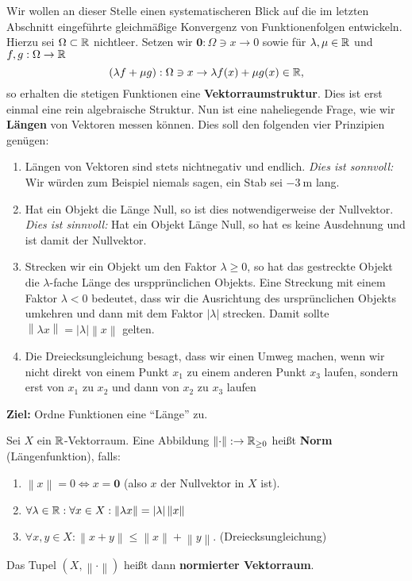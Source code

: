 Wir wollen an dieser Stelle einen systematischeren Blick auf die im letzten Abschnitt eingeführte gleichmäßige Konvergenz von Funktionenfolgen entwickeln. Hierzu sei $ \Omega \subset  \mathbb{R}  $ nichtleer. Setzen wir $ \mathbf{0}: \Omega \ni x \to 0 $ sowie für $ \lambda, \mu \in \mathbb{R}  $ und $ f,g:\Omega \to \mathbb{R}  $ 
\[
	(\lambda f + \mu g): \Omega \ni x \to \lambda f(x) + \mu g(x) \in \mathbb{R} ,
\]
so erhalten die stetigen Funktionen eine \textbf{Vektorraumstruktur}. Dies ist erst einmal eine rein algebraische Struktur. Nun ist eine naheliegende Frage, wie wir \textbf{Längen} von Vektoren messen können. Dies soll den folgenden vier Prinzipien genügen:
\begin{enumerate}[label=(P\arabic*)]
	\item Längen von Vektoren sind stets nichtnegativ und endlich. \textit{Dies ist sonnvoll:} Wir würden zum Beispiel niemals sagen, ein Stab sei $ \qty{ -3 }{ \metre }  $ lang.
	\item Hat ein Objekt die Länge Null, so ist dies notwendigerweise der Nullvektor. \textit{Dies ist sinnvoll:} Hat ein Objekt Länge Null, so hat es keine Ausdehnung und ist damit der Nullvektor.
	\item Strecken wir ein Objekt um den Faktor $ \lambda \geq 0 $, so hat das gestreckte Objekt die $ \lambda $-fache Länge des urspprünclichen Objekts. Eine Streckung mit einem Faktor $ \lambda < 0 $ bedeutet, dass wir die Ausrichtung des ursprünclichen Objekts umkehren und dann mit dem Faktor $ \left| \lambda \right| $ strecken. Damit sollte $ \left\| \lambda x \right\| = \left| \lambda \right| \left\| x \right\|  $ gelten.
	\item Die Dreiecksungleichung besagt, dass wir einen Umweg machen, wenn wir nicht direkt von einem Punkt $ x_1 $ zu einem anderen Punkt $ x_3 $ laufen, sondern erst von $ x_1 $ zu $ x_2 $ und dann von $ x_2 $ zu $ x_3 $ laufen
\end{enumerate}

\textbf{Ziel:} Ordne Funktionen eine ``Länge'' zu.
\begin{subdefinition}
	Sei $ X $ ein $ \mathbb{R}  $-Vektorraum. Eine Abbildung $ \left\| \cdot  \right\|: \to \mathbb{R} _{\geq 0}  $ heißt \textbf{Norm} (Längenfunktion), falls:
	\begin{enumerate}[label=(\roman*)]
		\item $ \left\| x \right\| = 0 \iff x = \mathbf{0} $ (also $ x $ der Nullvektor in $ X $ ist).
		\item $ \forall \lambda \in \mathbb{R} : \forall x \in X : \left\| \lambda x \right\| = \left| \lambda \right| \left\| x \right\| $
		\item $ \forall x,y \in X: \left\| x + y \right\| \leq \left\| x \right\| + \left\| y \right\| $. (Dreiecksungleichung)
	\end{enumerate}
	Das Tupel $ \left( X, \left\| \cdot  \right\| \right)  $ heißt dann \textbf{normierter Vektorraum}.
\end{subdefinition}

